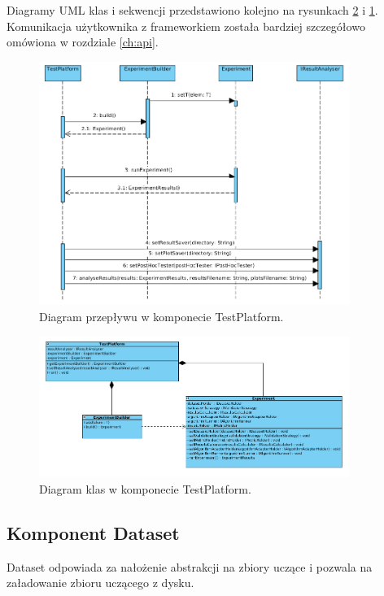 \documentclass[12pt]{article}
\begin{document}
Diagramy UML klas i sekwencji przedstawiono kolejno na rysunkach \ref{fig:classTestPlatform} i \ref{fig:sequenceTestPlatform}. Komunikacja użytkownika z frameworkiem została bardziej szczegółowo omówiona w rozdziale \ref{ch:api}.

\newpage
\begin{figure}[!h]
\centering
	\includegraphics[width=0.9\textwidth]{img/sequenceTestPlatform.png}
	\caption{Diagram przepływu w komponecie TestPlatform.}
	\label{fig:sequenceTestPlatform}
\end{figure}

\begin{figure}[!h]
\centering
	\includegraphics[width=0.9\textwidth]{img/class_diagrams/test_platform.png}
	\caption{Diagram klas w komponecie TestPlatform.}
	\label{fig:classTestPlatform}
\end{figure}
\newpage

\subsection{Komponent Dataset}

Dataset odpowiada za nałożenie abstrakcji na zbiory uczące i pozwala na załadowanie zbioru uczącego z dysku. 
\end{document}

